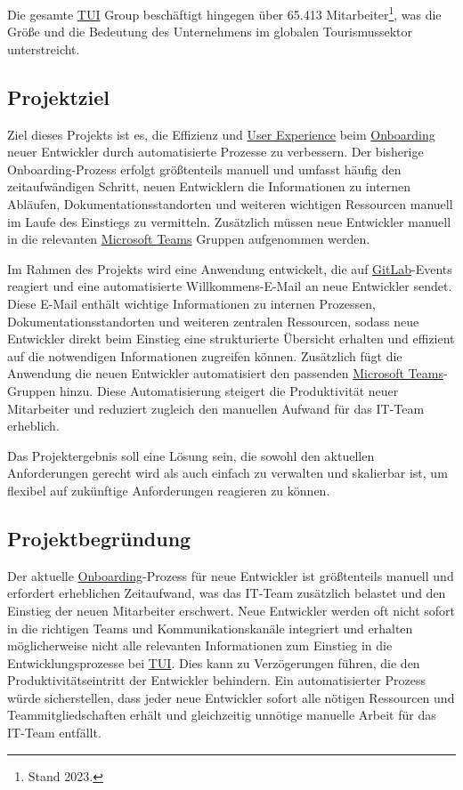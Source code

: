 Die gesamte \hyperlink{TUI}{\textcolor{AOBlau}{TUI}} Group beschäftigt hingegen über 65.413 Mitarbeiter\footnote{Stand 2023.}, was die Größe und die Bedeutung des Unternehmens im globalen Tourismussektor unterstreicht.


\subsection{Projektziel} 
\label{sec:Projektziel}

Ziel dieses Projekts ist es, die Effizienz und \hyperlink{UserExperience}{\textcolor{AOBlau}{User Experience}} beim \hyperlink{Onboarding}{\textcolor{AOBlau}{Onboarding}} neuer Entwickler durch automatisierte Prozesse zu verbessern. Der bisherige Onboarding-Prozess erfolgt größtenteils manuell und umfasst häufig den zeitaufwändigen Schritt, neuen Entwicklern die Informationen zu internen Abläufen, Dokumentationsstandorten und weiteren wichtigen Ressourcen manuell im Laufe des Einstiegs zu vermitteln. Zusätzlich müssen neue Entwickler manuell in die relevanten \hyperlink{MicrosoftTeams}{\textcolor{AOBlau}{Microsoft Teams}} Gruppen aufgenommen werden. 

Im Rahmen des Projekts wird eine Anwendung entwickelt, die auf \hyperlink{GitLab}{\textcolor{AOBlau}{GitLab}}-Events reagiert und eine automatisierte Willkommens-E-Mail an neue Entwickler sendet. Diese E-Mail enthält wichtige Informationen zu internen Prozessen, Dokumentationsstandorten und weiteren zentralen Ressourcen, sodass neue Entwickler direkt beim Einstieg eine strukturierte Übersicht erhalten und effizient auf die notwendigen Informationen zugreifen können. Zusätzlich fügt die Anwendung die neuen Entwickler automatisiert den passenden \hyperlink{MicrosoftTeams}{\textcolor{AOBlau}{Microsoft Teams}}-Gruppen hinzu. Diese Automatisierung steigert die Produktivität neuer Mitarbeiter und reduziert zugleich den manuellen Aufwand für das IT-Team erheblich.

Das Projektergebnis soll eine Lösung sein, die sowohl den aktuellen Anforderungen gerecht wird als auch einfach zu verwalten und skalierbar ist, um flexibel auf zukünftige Anforderungen reagieren zu können.

\subsection{Projektbegründung} 
\label{sec:Projektbegruendung}

Der aktuelle \hyperlink{Onboarding}{\textcolor{AOBlau}{Onboarding}}-Prozess für neue Entwickler ist größtenteils manuell und erfordert erheblichen Zeitaufwand, was das IT-Team zusätzlich belastet und den Einstieg der neuen Mitarbeiter erschwert. Neue Entwickler werden oft nicht sofort in die richtigen Teams und Kommunikationskanäle integriert und erhalten möglicherweise nicht alle relevanten Informationen zum Einstieg in die Entwicklungsprozesse bei \hyperlink{TUI}{\textcolor{AOBlau}{TUI}}. Dies kann zu Verzögerungen führen, die den Produktivitätseintritt der Entwickler behindern. Ein automatisierter Prozess würde sicherstellen, dass jeder neue Entwickler sofort alle nötigen Ressourcen und Teammitgliedschaften erhält und gleichzeitig unnötige manuelle Arbeit für das IT-Team entfällt.

